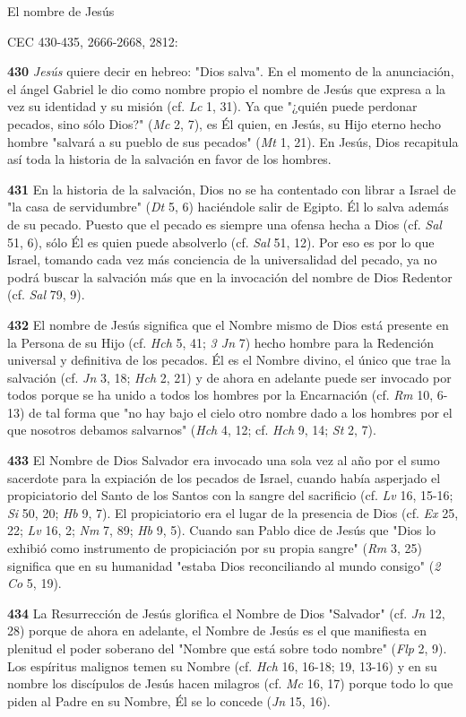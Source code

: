 \documentclass[]{article}
\begin{document}
El nombre de Jesús

CEC 430-435, 2666-2668, 2812:

\textbf{430} \emph{Jesús} quiere decir en hebreo: "Dios salva". En el
momento de la anunciación, el ángel Gabriel le dio como nombre propio el
nombre de Jesús que expresa a la vez su identidad y su misión (cf.
\emph{Lc} 1, 31). Ya que "¿quién puede perdonar pecados, sino sólo
Dios?" (\emph{Mc} 2, 7), es Él quien, en Jesús, su Hijo eterno hecho
hombre "salvará a su pueblo de sus pecados" (\emph{Mt} 1, 21). En Jesús,
Dios recapitula así toda la historia de la salvación en favor de los
hombres.

\textbf{431} En la historia de la salvación, Dios no se ha contentado
con librar a Israel de "la casa de servidumbre" (\emph{Dt} 5, 6)
haciéndole salir de Egipto. Él lo salva además de su pecado. Puesto que
el pecado es siempre una ofensa hecha a Dios (cf. \emph{Sal} 51, 6),
sólo Él es quien puede absolverlo (cf. \emph{Sal} 51, 12). Por eso es
por lo que Israel, tomando cada vez más conciencia de la universalidad
del pecado, ya no podrá buscar la salvación más que en la invocación del
nombre de Dios Redentor (cf. \emph{Sal} 79, 9).

\textbf{432} El nombre de Jesús significa que el Nombre mismo de Dios
está presente en la Persona de su Hijo (cf. \emph{Hch} 5, 41; \emph{3
Jn} 7) hecho hombre para la Redención universal y definitiva de los
pecados. Él es el Nombre divino, el único que trae la salvación (cf.
\emph{Jn} 3, 18; \emph{Hch} 2, 21) y de ahora en adelante puede ser
invocado por todos porque se ha unido a todos los hombres por la
Encarnación (cf. \emph{Rm} 10, 6-13) de tal forma que "no hay bajo el
cielo otro nombre dado a los hombres por el que nosotros debamos
salvarnos" (\emph{Hch} 4, 12; cf. \emph{Hch} 9, 14; \emph{St} 2, 7).

\textbf{433} El Nombre de Dios Salvador era invocado una sola vez al año
por el sumo sacerdote para la expiación de los pecados de Israel, cuando
había asperjado el propiciatorio del Santo de los Santos con la sangre
del sacrificio (cf. \emph{Lv} 16, 15-16; \emph{Si} 50, 20; \emph{Hb} 9,
7). El propiciatorio era el lugar de la presencia de Dios (cf. \emph{Ex}
25, 22; \emph{Lv} 16, 2; \emph{Nm} 7, 89; \emph{Hb} 9, 5). Cuando san
Pablo dice de Jesús que "Dios lo exhibió como instrumento de
propiciación por su propia sangre" (\emph{Rm} 3, 25) significa que en su
humanidad "estaba Dios reconciliando al mundo consigo" (\emph{2 Co} 5,
19).

\textbf{434} La Resurrección de Jesús glorifica el Nombre de Dios
"Salvador" (cf. \emph{Jn} 12, 28) porque de ahora en adelante, el Nombre
de Jesús es el que manifiesta en plenitud el poder soberano del "Nombre
que está sobre todo nombre" (\emph{Flp} 2, 9). Los espíritus malignos
temen su Nombre (cf. \emph{Hch} 16, 16-18; 19, 13-16) y en su nombre los
discípulos de Jesús hacen milagros (cf. \emph{Mc} 16, 17) porque todo lo
que piden al Padre en su Nombre, Él se lo concede (\emph{Jn} 15, 16).
\end{document}
